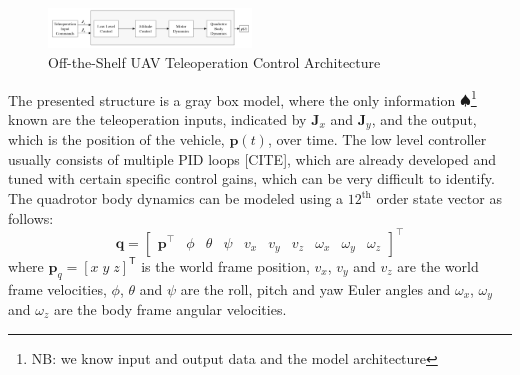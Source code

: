 \documentclass[letterpaper, 10 pt, conference]{ieeeconf}  %
\newcommand\NB[1]{$\spadesuit$\footnote{NB: #1}}
\begin{document}
\begin{figure}[ht]
    \includegraphics[width=0.48\textwidth]{images/teleopctrl.png}
    \caption{Off-the-Shelf UAV Teleoperation Control Architecture}
    \label{fig:otsctrl}
\end{figure}

The presented structure is a gray box model, where the only information \NB{we know input and output data and the model architecture} known are the teleoperation inputs, indicated by $\mathbf{J}_x$ and $\mathbf{J}_y$, and the output, which is the position of the vehicle, $\mathbf{p}(t)$, over time. The low level controller usually consists of multiple PID loops [CITE], which are already developed and tuned with certain specific control gains, which can be very difficult to identify. The quadrotor body dynamics can be modeled using a $12^{\text{th}}$ order state vector as follows:
\begin{equation}
    \mathbf{q} = 
    \begin{bmatrix}
    \mathbf{p}^\intercal & \phi & \theta & \psi & v_x & v_y & v_z & \omega_x & \omega_y & \omega_z
    \end{bmatrix}^\intercal \nonumber
\end{equation} 
where $\bm{p}_q=[x \; y \; z]^{\mathsf{T}}$ is the world frame position, $v_{x}$, $v_{y}$ and $v_z$ are the world frame velocities, $\phi$, $\theta$ and $\psi$ are the roll, pitch and yaw Euler angles and $\omega_{x}$, $\omega_{y}$ and $\omega_{z}$ are the body frame angular velocities.
\end{document}
